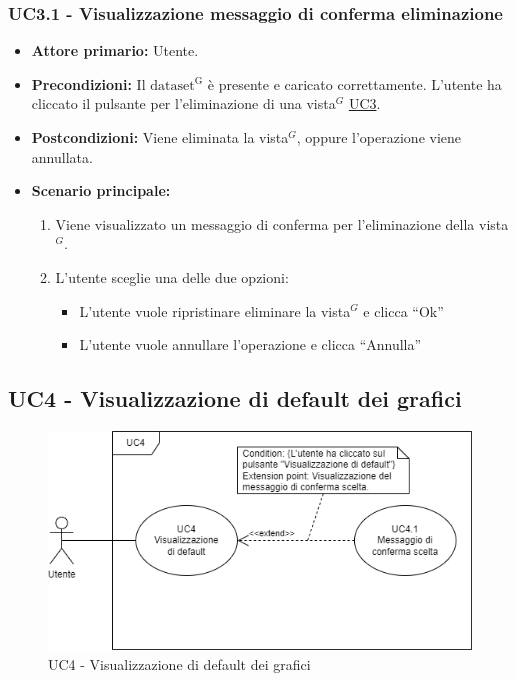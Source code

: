 \subsubsection{UC3.1 - Visualizzazione messaggio di conferma eliminazione}
\label{sec:UC3.1}
\begin{itemize}
	\item \textbf{Attore primario:} Utente.
	\item \textbf{Precondizioni:} Il ${\mathrm{dataset^{G}}}$ è presente e caricato correttamente. L'utente ha cliccato il pulsante per l'eliminazione di una vista$^{G}$ \hyperref[sec:UC3]{UC3}.
	\item \textbf{Postcondizioni:} Viene eliminata la vista$^{G}$, oppure l'operazione viene annullata.
	\item \textbf{Scenario principale:}
		\begin{enumerate}
		\item Viene visualizzato un messaggio di conferma per l'eliminazione della vista$^{G}$.
		\item L'utente sceglie una delle due opzioni:
			\begin{itemize}
				\item L'utente vuole ripristinare eliminare la vista$^{G}$ e clicca ``Ok''
				\item L'utente vuole annullare l'operazione e clicca ``Annulla''
			\end{itemize}
		\end{enumerate}
\end{itemize}

\newpage


\subsection{UC4 - Visualizzazione di default dei grafici}
\label{sec:UC4}
\begin{figure}[h!]
    \centering
    \includegraphics[scale=0.60]{../../assets/visualizzazione_default.png}
	\caption{UC4 - Visualizzazione di default dei grafici}
\end{figure}

